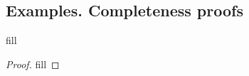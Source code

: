 \subsection{Examples. Completeness proofs}

\begin{exercise}{1}
fill
\end{exercise}
\begin{proof}
fill
\end{proof}